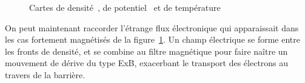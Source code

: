 \begin{refsection}
	\begin{figure}[!htbp]
  \centering
    \caption{Cartes de densité~, de
    potentiel~ et de
    température}
    \label{4-PegasesCarteDensiteVarBiasWave}
\end{figure}

On peut maintenant raccorder l'étrange flux électronique qui apparaissait dans
les cas fortement magnétisés de la
figure~\ref{4-PegasesCarteDensiteVarBiasWave}. Un champ électrique se forme
entre les fronts de densité, et se combine au filtre
magnétique pour faire naître un mouvement de dérive du type ExB, exacerbant le
transport des électrons au travers de la barrière. 


\end{refsection}
